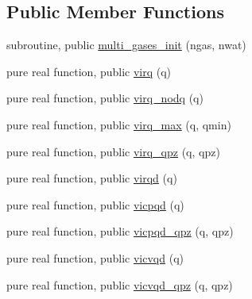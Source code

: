 \subsection*{Public Member Functions}
\begin{DoxyCompactItemize}
\item 
subroutine, public \hyperlink{classmulti__gases__mod_afbd34020a75694f0ac19e85dbb8eda6f}{multi\-\_\-gases\-\_\-init} (ngas, nwat)
\item 
pure real function, public \hyperlink{classmulti__gases__mod_a91649465dfa64dee4a0aa4db33496b34}{virq} (q)
\item 
pure real function, public \hyperlink{classmulti__gases__mod_a8af118271aa8e7a233066a10924e0d05}{virq\-\_\-nodq} (q)
\item 
pure real function, public \hyperlink{classmulti__gases__mod_ab6332eff515faa91fd8560fff744f704}{virq\-\_\-max} (q, qmin)
\item 
pure real function, public \hyperlink{classmulti__gases__mod_a74a40323e9be4271dffedfbb671c938c}{virq\-\_\-qpz} (q, qpz)
\item 
pure real function, public \hyperlink{classmulti__gases__mod_ab87c41f9b4f50367c76dc2e2eb4f1463}{virqd} (q)
\item 
pure real function, public \hyperlink{classmulti__gases__mod_a6b697df6baca53e2991067cbccd96633}{vicpqd} (q)
\item 
pure real function, public \hyperlink{classmulti__gases__mod_a99afa1ce63a683c4e24eaf27071fde67}{vicpqd\-\_\-qpz} (q, qpz)
\item 
pure real function, public \hyperlink{classmulti__gases__mod_a5e1943c9700f309e8ae9f475588f3b4c}{vicvqd} (q)
\item 
pure real function, public \hyperlink{classmulti__gases__mod_acb1e93aa8c8cb0d6bd5eff19d2a79885}{vicvqd\-\_\-qpz} (q, qpz)
\end{DoxyCompactItemize}
